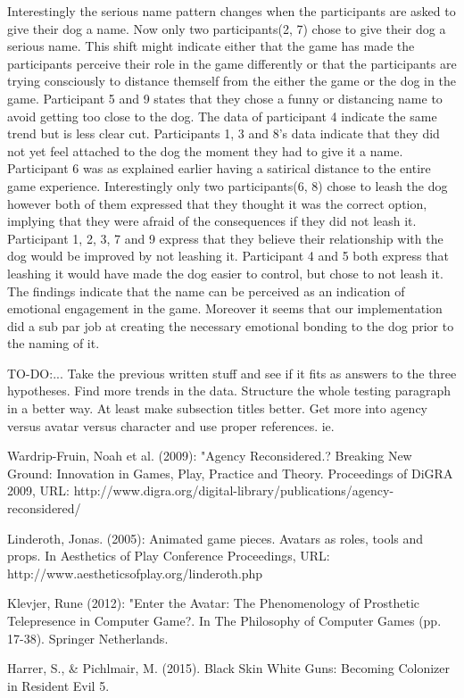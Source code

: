 Interestingly the serious name pattern changes when the participants are asked to give their dog a name. Now only two participants(2, 7) chose to give their dog a serious name. This shift might indicate either that the game has made the participants perceive their role in the game differently or that the participants are trying consciously to distance themself from the either the game or the dog in the game. Participant 5 and 9 states that they chose a funny or distancing name to avoid getting too close to the dog. The data of participant 4 indicate the same trend but is less clear cut. Participants 1, 3 and 8's data indicate that they did not yet feel attached to the dog the moment they had to give it a name. Participant 6 was as explained earlier having a satirical distance to the entire game experience.
Interestingly only two participants(6, 8) chose to leash the dog however both of them expressed that they thought it was the correct option, implying that they were afraid of the consequences if they did not leash it. Participant 1, 2, 3, 7 and 9 express that they believe their relationship with the dog would be improved by not leashing it. Participant 4 and 5 both express that leashing it would have made the dog easier to control, but chose to not leash it. The findings indicate that the name can be perceived as an indication of emotional engagement in the game. Moreover it seems that our implementation did a sub par job at creating the necessary emotional bonding to the dog prior to the naming of it.





TO-DO:...
Take the previous written stuff and see if it fits as answers to the three hypotheses. Find more trends in the data. Structure the whole testing paragraph in a better way. At least make subsection titles better. Get more into agency versus avatar versus character and use proper references.
ie. 

Wardrip-Fruin, Noah et al. (2009): "Agency Reconsidered.? Breaking New Ground: Innovation in Games, Play, Practice and Theory. Proceedings of DiGRA 2009, URL: http://www.digra.org/digital-library/publications/agency-reconsidered/

Linderoth, Jonas. (2005): Animated game pieces. Avatars as roles, tools and props. In Aesthetics of Play Conference Proceedings, URL: http://www.aestheticsofplay.org/linderoth.php

Klevjer, Rune (2012): "Enter the Avatar: The Phenomenology of Prosthetic Telepresence in Computer Game?. In The Philosophy of Computer Games (pp. 17-38). Springer Netherlands.

Harrer, S., \& Pichlmair, M. (2015). Black Skin White Guns: Becoming Colonizer in Resident Evil 5.
